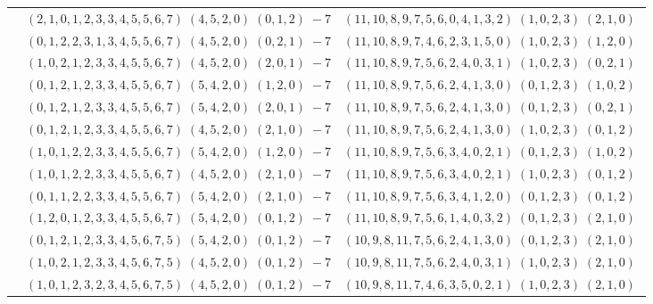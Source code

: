 \documentclass[11pt]{article}
\begin{document}
\begin{longtable}[l]{|c|c|c|}
 \cline{2-3} 
 & $(2 ,1 ,0 ,1 ,2 ,3 ,3 ,4 ,5 ,5 ,6 ,7) \;(4 ,5 ,2 ,0) \;(0 ,1 ,2) \;-7$ & $(11 ,10 ,8 ,9 ,7 ,5 ,6 ,0 ,4 ,1 ,3 ,2) \;(1 ,0 ,2 ,3) \;(2 ,1 ,0) \;$\\ 
 \cline{2-3} 
 & $(0 ,1 ,2 ,2 ,3 ,1 ,3 ,4 ,5 ,5 ,6 ,7) \;(4 ,5 ,2 ,0) \;(0 ,2 ,1) \;-7$ & $(11 ,10 ,8 ,9 ,7 ,4 ,6 ,2 ,3 ,1 ,5 ,0) \;(1 ,0 ,2 ,3) \;(1 ,2 ,0) \;$\\ 
 \cline{2-3} 
 & $(1 ,0 ,2 ,1 ,2 ,3 ,3 ,4 ,5 ,5 ,6 ,7) \;(4 ,5 ,2 ,0) \;(2 ,0 ,1) \;-7$ & $(11 ,10 ,8 ,9 ,7 ,5 ,6 ,2 ,4 ,0 ,3 ,1) \;(1 ,0 ,2 ,3) \;(0 ,2 ,1) \;$\\ 
 \cline{2-3} 
 & $(0 ,1 ,2 ,1 ,2 ,3 ,3 ,4 ,5 ,5 ,6 ,7) \;(5 ,4 ,2 ,0) \;(1 ,2 ,0) \;-7$ & $(11 ,10 ,8 ,9 ,7 ,5 ,6 ,2 ,4 ,1 ,3 ,0) \;(0 ,1 ,2 ,3) \;(1 ,0 ,2) \;$\\ 
 \cline{2-3} 
 & $(0 ,1 ,2 ,1 ,2 ,3 ,3 ,4 ,5 ,5 ,6 ,7) \;(5 ,4 ,2 ,0) \;(2 ,0 ,1) \;-7$ & $(11 ,10 ,8 ,9 ,7 ,5 ,6 ,2 ,4 ,1 ,3 ,0) \;(0 ,1 ,2 ,3) \;(0 ,2 ,1) \;$\\ 
 \cline{2-3} 
 & $(0 ,1 ,2 ,1 ,2 ,3 ,3 ,4 ,5 ,5 ,6 ,7) \;(4 ,5 ,2 ,0) \;(2 ,1 ,0) \;-7$ & $(11 ,10 ,8 ,9 ,7 ,5 ,6 ,2 ,4 ,1 ,3 ,0) \;(1 ,0 ,2 ,3) \;(0 ,1 ,2) \;$\\ 
 \cline{2-3} 
 & $(1 ,0 ,1 ,2 ,2 ,3 ,3 ,4 ,5 ,5 ,6 ,7) \;(5 ,4 ,2 ,0) \;(1 ,2 ,0) \;-7$ & $(11 ,10 ,8 ,9 ,7 ,5 ,6 ,3 ,4 ,0 ,2 ,1) \;(0 ,1 ,2 ,3) \;(1 ,0 ,2) \;$\\ 
 \cline{2-3} 
 & $(1 ,0 ,1 ,2 ,2 ,3 ,3 ,4 ,5 ,5 ,6 ,7) \;(4 ,5 ,2 ,0) \;(2 ,1 ,0) \;-7$ & $(11 ,10 ,8 ,9 ,7 ,5 ,6 ,3 ,4 ,0 ,2 ,1) \;(1 ,0 ,2 ,3) \;(0 ,1 ,2) \;$\\ 
 \cline{2-3} 
 & $(0 ,1 ,1 ,2 ,2 ,3 ,3 ,4 ,5 ,5 ,6 ,7) \;(5 ,4 ,2 ,0) \;(2 ,1 ,0) \;-7$ & $(11 ,10 ,8 ,9 ,7 ,5 ,6 ,3 ,4 ,1 ,2 ,0) \;(0 ,1 ,2 ,3) \;(0 ,1 ,2) \;$\\ 
 \cline{2-3} 
 & $(1 ,2 ,0 ,1 ,2 ,3 ,3 ,4 ,5 ,5 ,6 ,7) \;(5 ,4 ,2 ,0) \;(0 ,1 ,2) \;-7$ & $(11 ,10 ,8 ,9 ,7 ,5 ,6 ,1 ,4 ,0 ,3 ,2) \;(0 ,1 ,2 ,3) \;(2 ,1 ,0) \;$\\ 
 \cline{2-3} 
 & $(0 ,1 ,2 ,1 ,2 ,3 ,3 ,4 ,5 ,6 ,7 ,5) \;(5 ,4 ,2 ,0) \;(0 ,1 ,2) \;-7$ & $(10 ,9 ,8 ,11 ,7 ,5 ,6 ,2 ,4 ,1 ,3 ,0) \;(0 ,1 ,2 ,3) \;(2 ,1 ,0) \;$\\ 
 \cline{2-3} 
 & $(1 ,0 ,2 ,1 ,2 ,3 ,3 ,4 ,5 ,6 ,7 ,5) \;(4 ,5 ,2 ,0) \;(0 ,1 ,2) \;-7$ & $(10 ,9 ,8 ,11 ,7 ,5 ,6 ,2 ,4 ,0 ,3 ,1) \;(1 ,0 ,2 ,3) \;(2 ,1 ,0) \;$\\ 
 \cline{2-3} 
 & $(1 ,0 ,1 ,2 ,3 ,2 ,3 ,4 ,5 ,6 ,7 ,5) \;(4 ,5 ,2 ,0) \;(0 ,1 ,2) \;-7$ & $(10 ,9 ,8 ,11 ,7 ,4 ,6 ,3 ,5 ,0 ,2 ,1) \;(1 ,0 ,2 ,3) \;(2 ,1 ,0) \;$\\ \hline
  
 \end{longtable} 
 
\end{document}

